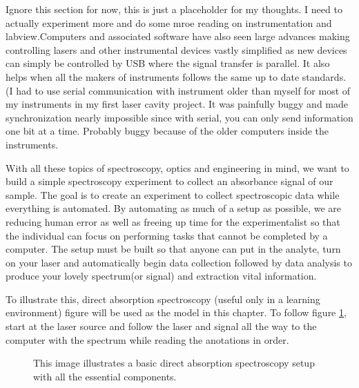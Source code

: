 \documentclass[a4paper]{book}
\newcommand{\imginput}[1]{} %
\begin{document}
	Ignore this section for now, this is just a placeholder for my thoughts. I need to actually experiment more and do some mroe reading on instrumentation and labview.Computers and associated software have also seen large advances making controlling lasers and other instrumental devices vastly simplified as new devices can simply be controlled by USB where the signal transfer is parallel. It also helps when all the makers of instruments follows the same up to date standards. (I had to use serial communication with instrument older than myself for most of my instruments in my first laser cavity project. It was painfully buggy and made synchronization nearly impossible since with serial, you can only send information one bit at a time. Probably buggy because of the older computers inside the instruments.

	With all these topics of spectroscopy, optics and engineering in mind, we want to build a simple spectroscopy experiment to collect an absorbance signal of our sample. The goal is to create an experiment to collect spectroscopic data while everything is automated. By automating as much of a setup as possible, we are reducing human error as well as freeing up time for the experimentalist so that the individual can focus on performing tasks that cannot be completed by a computer.  The setup must be built so that anyone can put in the analyte, turn on your laser and automatically begin data collection followed by data analysis to produce your lovely spectrum(or signal) and extraction vital information.
	
	To illustrate this, direct absorption spectroscopy (useful only in a learning environment) figure will be used as the model in this chapter. To follow figure \ref{fig:dir-abs-spec-setup}, start at the laser source and follow the laser and signal all the way to the computer with the spectrum while reading the anotations in order.
	
	\begin{figure} [!ht]
		\centering
		\def\svgwidth{\columnwidth}
		\resizebox{16cm}{!}{\imginput{images/dir-abs-spec-setup.pdf_tex}}
		\caption{This image illustrates a basic direct absorption spectroscopy setup with all the essential components.}
		\label{fig:dir-abs-spec-setup}
	\end{figure}	
	
\end{document}
